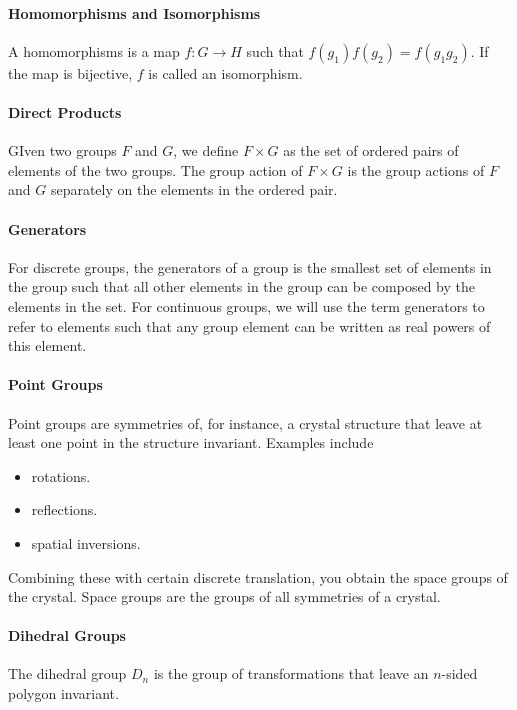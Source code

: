 
\paragraph{Homomorphisms and Isomorphisms}
A homomorphisms is a map $f: G\to H$ such that $f(g_{1})f(g_{2}) = f(g_{1}g_{2})$. If the map is bijective, $f$ is called an isomorphism.

\paragraph{Direct Products}
GIven two groups $F$ and $G$, we define $F\times G$ as the set of ordered pairs of elements of the two groups. The group action of $F\times G$ is the group actions of $F$ and $G$ separately on the elements in the ordered pair.

\paragraph{Generators}
For discrete groups, the generators of a group is the smallest set of elements in the group such that all other elements in the group can be composed by the elements in the set. For continuous groups, we will use the term generators to refer to elements such that any group element can be written as real powers of this element.

\paragraph{Point Groups}
Point groups are symmetries of, for instance, a crystal structure that leave at least one point in the structure invariant. Examples include
\begin{itemize}
	\item rotations.
	\item reflections.
	\item spatial inversions.
\end{itemize}
Combining these with certain discrete translation, you obtain the space groups of the crystal. Space groups are the groups of all symmetries of a crystal.

\paragraph{Dihedral Groups}
The dihedral group $D_{n}$ is the group of transformations that leave an $n$-sided polygon invariant.

